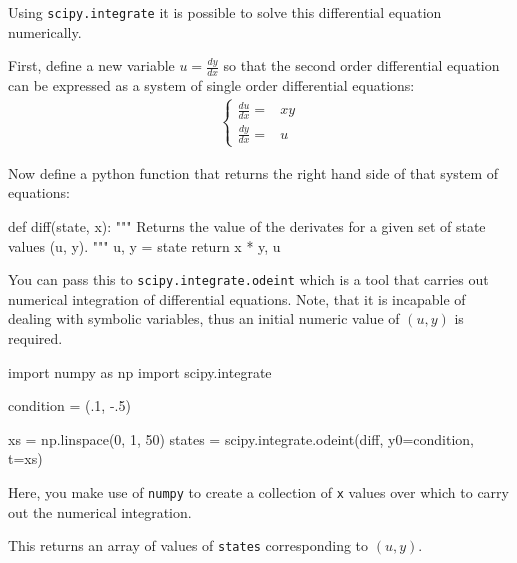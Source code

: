 Using \texttt{scipy.integrate} it is possible to solve this differential equation numerically.


First, define a new variable \(u=\frac{dy}{dx}\) so that the second order
differential equation can be expressed as a system of single order differential
equations:
\begin{equation*}
\begin{split}
    \begin{cases}
        \frac{du}{dx}=&xy\\
        \frac{dy}{dx}=&u
    \end{cases}
\end{split}
\end{equation*}

Now define a python function that returns the right hand side of that
system of equations:




\begin{pyin}
def diff(state, x):
    """
    Returns the value of the derivates for a given set of state values (u, y).
    """
    u, y = state
    return x * y, u
\end{pyin}





You can pass this to \texttt{scipy.integrate.odeint} which is a tool that carries out
numerical integration of differential equations. Note, that it is incapable of
dealing with symbolic variables, thus an initial numeric value of \((u, y)\) is
required.




\begin{pyin}
import numpy as np
import scipy.integrate

condition = (.1, -.5)

xs = np.linspace(0, 1, 50)
states = scipy.integrate.odeint(diff, y0=condition, t=xs)

\end{pyin}






\begin{note}
Here, you make use of
\texttt{numpy} to create a collection
of \texttt{x} values over which to carry out the numerical integration.
\end{note}



This returns an array of values of \texttt{states} corresponding to \((u, y)\).





